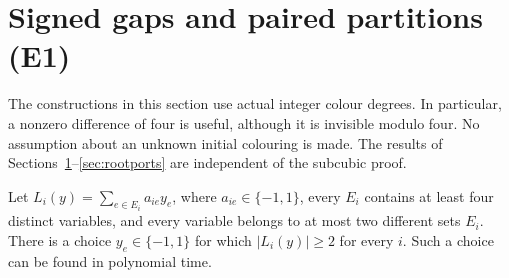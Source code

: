 \section{Signed gaps and paired partitions (E1)}\label{sec:signedgap}

The constructions in this section use actual integer colour degrees.
In particular, a nonzero difference of four is useful, although it is
invisible modulo four. No assumption about an unknown initial colouring
is made. The results of Sections~\ref{sec:signedgap}--\ref{sec:rootports}
are independent of the subcubic proof.

\begin{lemma}\label{lem:signedgap}
Let $L_i(y)=\sum_{e\in E_i}a_{ie}y_e$, where $a_{ie}\in\{-1,1\}$,
every $E_i$ contains at least four distinct variables, and every variable
belongs to at most two different sets $E_i$. There is a choice
$y_e\in\{-1,1\}$ for which $|L_i(y)|\ge2$ for every $i$.
Such a choice can be found in polynomial time.
\end{lemma}
